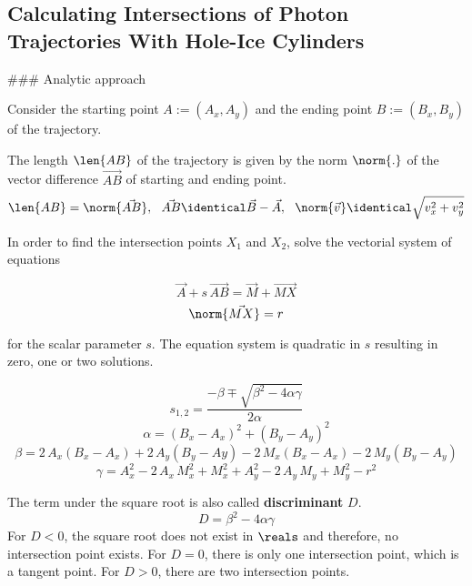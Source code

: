 
\subsection{Calculating Intersections of Photon Trajectories With Hole-Ice Cylinders}
\label{sec:intersections}

### Analytic approach


Consider the starting point $A := (A_x, A_y)$ and the ending point $B := (B_x, B_y)$ of the trajectory.

The length $\len{AB}$ of the trajectory is given by the norm $\norm{.}$ of the vector difference $\vec{AB}$ of starting and ending point.
\begin{equation} \notag
  \len{AB} = \norm{\vec{AB}}, \ \ \vec{AB} \identical \vec{B} - \vec{A}, \ \ \norm{\vec{v}} \identical \sqrt{v_x^2 + v_y^2}
\end{equation}

In order to find the intersection points $X_1$ and $X_2$, solve the vectorial system of equations

\begin{equation}
  \vec{A} + s \, \vec{AB} = \vec{M} + \vec{MX}
\end{equation}
\begin{equation}
  \norm{\vec{MX}} = r
\end{equation}

for the scalar parameter $s$. The equation system is quadratic in $s$ resulting in zero, one or two solutions.

\begin{equation}
  s_{1,2} = \frac{-\beta \mp \sqrt{\beta^2 - 4\alpha\gamma}}{2\alpha}
\end{equation}
\begin{equation}
  \alpha = (B_x - A_x)^2 + (B_y - A_y)^2
\end{equation}
\begin{equation}
  \beta = 2\,A_x(B_x-A_x) + 2\,A_y(B_y-Ay) - 2\,M_x(B_x-A_x) - 2\,M_y(B_y-A_y)
\end{equation}
\begin{equation}
  \gamma = A_x^2 - 2\,A_x\,M_x^2 + M_x^2 + A_y^2 - 2\,A_y\,M_y + M_y^2 - r^2
\end{equation}

The term under the square root is also called \textbf{discriminant} $D$.
\begin{equation}
  D = \beta^2 - 4\alpha\gamma
\end{equation}
For $D < 0$, the square root does not exist in $\reals$ and therefore, no intersection point exists. For $D = 0$, there is only one intersection point, which is a tangent point. For $D > 0$, there are two intersection points.

